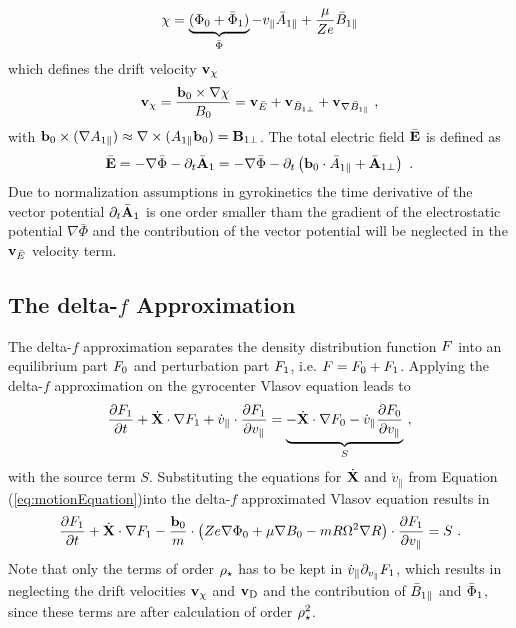 \begin{gather}
	\chi = \underbrace{(\Phi_0 + \bar{\Phi}_1)}_{\bar{\Phi}} - v_\parallel \bar{A}_{1\parallel} + \frac{\mu}{Ze} \bar{B}_{1\parallel}
	\label{eq:driftPotential}
\end{gather}
which defines the drift velocity $\boldsymbol{\mathbf{v}}_\chi$ 
\begin{gather}
	\boldsymbol{\mathbf{v}}_\chi = \frac{\boldsymbol{\mathbf{b}}_0 \times \nabla \chi}{B_0} = \boldsymbol{\mathbf{v}}_{\bar{E}} + \boldsymbol{\mathbf{v}}_{\bar{B}_{1\perp}} + \boldsymbol{\mathbf{v}}_{\nabla \bar{B}_{1\parallel}}~,
	\label{eq:veloDriftPotential}
\end{gather}
with $\boldsymbol{\mathbf{b}}_0 \times (\nabla A_{1\parallel}) \approx \nabla \times (A_{1\parallel} \boldsymbol{\mathbf{b}}_0) = \boldsymbol{\mathbf{B}}_{1\perp}$. The total electric field $\bar{\boldsymbol{\mathbf{E}}}$ is defined as 
\begin{gather}
	\bar{\boldsymbol{\mathbf{E}}} = - \nabla \bar{\Phi} - \partial_t \bar{\boldsymbol{\mathbf{A}}}_1 = - \nabla \bar{\Phi} - \partial_t \left(\boldsymbol{\mathbf{b}}_0 \cdot \bar{A}_{1\parallel} + \bar{\boldsymbol{\mathbf{A}}}_{1\perp} \right)  ~.
	\label{eq:totalElectricField}
\end{gather}
Due to normalization assumptions in gyrokinetics \cite{Peeters2009A} the time derivative of the vector potential $\partial_t \bar{\boldsymbol{\mathbf{A}}}_1$ is one order smaller tham the gradient of the electrostatic potential $\nabla \bar{\Phi}$ and the contribution of the vector potential will be neglected in the $\boldsymbol{\mathbf{v}}_{\bar{E}}$ velocity term.

\newpage

\subsection{The delta-\!$f$ Approximation}
\label{sub:approximation}

The delta-\!$f$ approximation separates the density distribution function $F$ into an equilibrium part $F_0$ and perturbation part $F_1$, i.e. $F = F_0 + F_1$. Applying the delta-\!$f$ approximation on the gyrocenter Vlasov equation leads to
\begin{gather}
	\frac{\partial F_1}{\partial t} + \dot{\boldsymbol{\mathbf{X}}} \cdot \nabla F_1 + \dot{v}_\parallel \cdot \frac{\partial F_1}{\partial v_\parallel} = \underbrace{- \dot{\boldsymbol{\mathbf{X}}} \cdot \nabla F_0 - \dot{v}_\parallel \frac{\partial F_0}{\partial v_\parallel}}_S~,
	\label{eq:gyrocenterDeltafVlasov}
\end{gather}
with the source term $S$. Substituting the equations for $\dot{\boldsymbol{\mathbf{X}}}$ and $\dot{v}_\parallel$ from Equation (\ref{eq:motionEquation})into the delta-$f$ approximated Vlasov equation results in
\begin{gather}
	\frac{\partial F_1}{\partial t} + \dot{\boldsymbol{\mathbf{X}}} \cdot \nabla F_1 - \frac{\boldsymbol{\mathbf{b}}_0}{m} \cdot \left(Ze\nabla \Phi_0 + \mu \nabla B_0 - mR \Omega^2 \nabla R \right) \cdot \frac{\partial F_1}{\partial v_\parallel} = S~.
	\label{eq:gyrocenterDeltafSubVlasov}
\end{gather}
Note that only the terms of order $\rho_\star$ has to be kept in $\dot{v}_\parallel \partial_{v_\parallel} F_1$, which results in neglecting the drift velocities $\boldsymbol{\mathbf{v}}_\chi$ and $\boldsymbol{\mathbf{v}}_\mathrm{D}$ and the contribution of $\bar{B}_{1\parallel}$ and $\bar{\Phi}_1$, since these terms are after calculation of order $\rho_\star^2$. \bigskip

